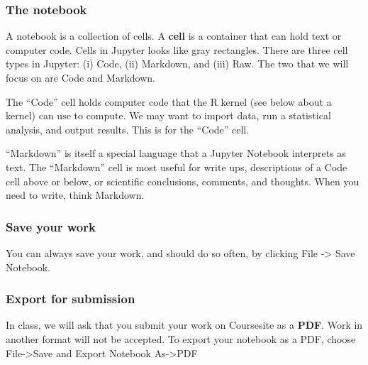 \hypertarget{the-notebook}{%
\subsubsection{The notebook}\label{the-notebook}}

A notebook is a collection of cells. A \textbf{cell} is a container that
can hold text or computer code. Cells in Jupyter looks like gray
rectangles. There are three cell types in Jupyter: (i) Code, (ii)
Markdown, and (iii) Raw. The two that we will focus on are Code and
Markdown.

The ``Code'' cell holds computer code that the R kernel (see below about
a kernel) can use to compute. We may want to import data, run a
statistical analysis, and output results. This is for the ``Code'' cell.

``Markdown'' is itself a special language that a Jupyter Notebook
interprets as text. The ``Markdown'' cell is most useful for write ups,
descriptions of a Code cell above or below, or scientific conclusions,
comments, and thoughts. When you need to write, think Markdown.

\hypertarget{save-your-work}{%
\subsubsection{Save your work}\label{save-your-work}}

You can always save your work, and should do so often, by clicking File
-\textgreater{} Save Notebook.

\hypertarget{export-for-submission}{%
\subsubsection{Export for submission}\label{export-for-submission}}

In class, we will ask that you submit your work on Coursesite as a
\textbf{PDF}. Work in another format will not be accepted. To export
your notebook as a PDF, choose File-\textgreater Save and Export
Notebook As-\textgreater PDF 

